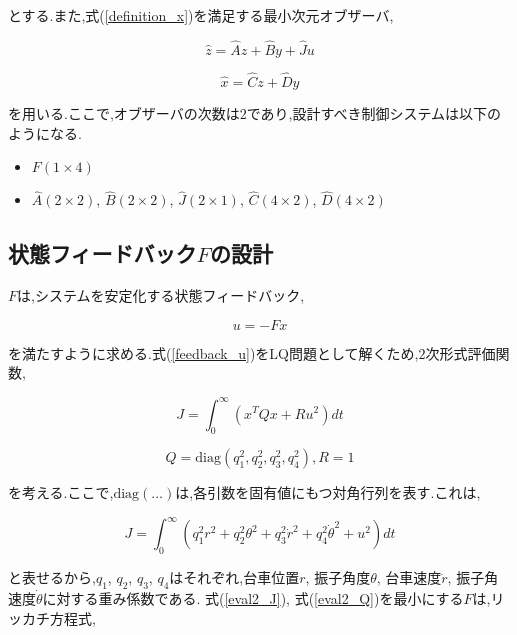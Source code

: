 とする.また,式(\ref{definition_x})を満足する最小次元オブザーバ,

\begin{equation}
    \hat{z} = \hat{A}z + \hat{B}y + \hat{J}u
    \label{z_hat}
\end{equation}

\begin{equation}
    \hat{x} = \hat{C}z + \hat{D}y
    \label{x_hat}
\end{equation}

を用いる.ここで,オブザーバの次数は$2$であり,設計すべき制御システムは以下のようになる.

\begin{itemize}
    \item $F(1 \times 4)$
    \item $\hat{A}(2 \times 2)$, $\hat{B}(2 \times 2)$, 
    $\hat{J}(2 \times 1)$, $\hat{C}(4 \times 2)$, $\hat{D}(4 \times 2)$
\end{itemize}


\subsection{状態フィードバック$F$の設計}
$F$は,システムを安定化する状態フィードバック,

\begin{equation}
    u = -Fx
    \label{feedback_u}
\end{equation}

を満たすように求める.式(\ref{feedback_u})をLQ問題として解くため,$2$次形式評価関数,

\begin{equation}
    J = \int_{0}^{\infty}
    \left(
        x^{T}Qx + Ru^2
    \right)
    dt
    \label{eval2_J}
\end{equation}

\begin{equation}
    Q = \mbox{diag}(q_{1}^2, q_{2}^2, q_{3}^2, q_{4}^2), R = 1
    \label{eval2_Q}
\end{equation}

を考える.ここで,$\mbox{diag}(\dots)$は,各引数を固有値にもつ対角行列を表す.これは,

\begin{equation}
    J = \int_{0}^{\infty}
    \left(
        q_{1}^2 r^2 + q_{2}^2 \theta^2 + q_{3}^2 \dot{r}^2 + q_{4}^2 \dot{\theta}^2 + u^2
    \right)
    dt
\end{equation}

と表せるから,$q_{1}$, $q_{2}$, $q_{3}$, $q_{4}$はそれぞれ,台車位置$r$, 振子角度$\theta$,
台車速度$\dot{r}$, 振子角速度$\dot{\theta}$に対する重み係数である.
式(\ref{eval2_J}), 式(\ref{eval2_Q})を最小にする$F$は,リッカチ方程式,

